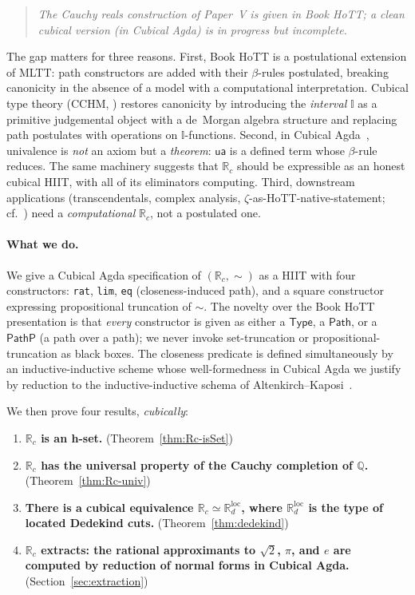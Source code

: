 \documentclass[12pt]{article}
\theoremstyle{definition}
\theoremstyle{remark}
\newcommand{\Type}{\mathsf{Type}}
\newcommand{\Q}{\mathbb{Q}}
\newcommand{\Rc}{\mathbb{R}_{c}}
\newcommand{\Rd}{\mathbb{R}_{d}}
\newcommand{\ua}{\mathsf{ua}}
\newcommand{\eqv}{\simeq}
\newcommand{\Path}{\mathsf{Path}}
\newcommand{\PathP}{\mathsf{PathP}}
\newcommand{\II}{\mathbb{I}}
\newcommand{\close}{\mathrel{\sim}}
\begin{document}
\begin{quote}\itshape
The Cauchy reals construction of Paper~V is given in Book HoTT; a clean
cubical version (in Cubical Agda) is in progress but incomplete.
\end{quote}

The gap matters for three reasons. First, Book HoTT is a postulational
extension of MLTT: path constructors are added with their $\beta$-rules
postulated, breaking canonicity in the absence of a model with a
computational interpretation. Cubical type theory (CCHM,
\cite{CCHM}) restores canonicity by introducing the
\emph{interval} $\II$ as a primitive judgemental object with a de~Morgan
algebra structure and replacing path postulates with operations on
$\II$-functions. Second, in Cubical Agda~\cite{CubicalAgda}, univalence is
\emph{not} an axiom but a \emph{theorem}: $\ua$ is a defined term whose
$\beta$-rule reduces. The same machinery suggests that $\Rc$ should be
expressible as an honest cubical HIIT, with all of its eliminators
computing. Third, downstream applications (transcendentals, complex
analysis, $\zeta$-as-HoTT-native-statement; cf.\ \cite[\S 7.3]{SynthesisHoTT}) need a
\emph{computational} $\Rc$, not a postulated one.

\paragraph{What we do.}
We give a Cubical Agda specification of $(\Rc,\close)$ as a HIIT with four
constructors: \texttt{rat}, \texttt{lim}, \texttt{eq} (closeness-induced
path), and a square constructor expressing propositional truncation of
$\close$. The novelty over the Book HoTT presentation is that
\emph{every} constructor is given as either a $\Type$, a $\Path$, or a
$\PathP$ (a path over a path); we never invoke set-truncation or
propositional-truncation as black boxes. The closeness predicate is
defined simultaneously by an inductive-inductive scheme whose well-formedness
in Cubical Agda we justify by reduction to the inductive-inductive
schema of Altenkirch--Kaposi~\cite{AltenkirchKaposi}.

We then prove four results, \emph{cubically}:

\begin{enumerate}
\item[(R1)] \textbf{$\Rc$ is an h-set.} (Theorem~\ref{thm:Rc-isSet})
\item[(R2)] \textbf{$\Rc$ has the universal property of the Cauchy
completion of $\Q$.} (Theorem~\ref{thm:Rc-univ})
\item[(R3)] \textbf{There is a cubical equivalence
$\Rc \eqv \Rd^{\text{loc}}$, where $\Rd^{\text{loc}}$ is the type of
located Dedekind cuts.} (Theorem~\ref{thm:dedekind})
\item[(R4)] \textbf{$\Rc$ extracts: the rational approximants to
$\sqrt{2}$, $\pi$, and $e$ are computed by reduction of normal forms in
Cubical Agda.} (Section~\ref{sec:extraction})
\end{enumerate}
\end{document}
